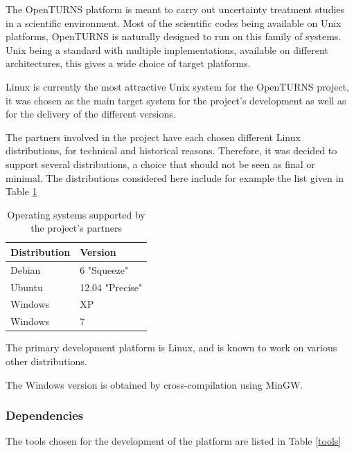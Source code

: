 The OpenTURNS platform is meant to carry out uncertainty treatment studies in a scientific environment. Most of the scientific codes being available on Unix platforms, OpenTURNS is naturally designed to run on this family of systems. Unix being a standard with multiple implementations, available on different architectures, this gives a wide choice of target platforms.

Linux is currently the most attractive Unix system for the OpenTURNS project, it was chosen as the main target system for the project's development as well as for the delivery of the different versions.

The partners involved in the project have each chosen different Linux distributions, for technical and historical reasons. Therefore, it was decided to support several distributions, a choice that should not be seen as final or minimal. The distributions considered here include for example the list given in Table \ref{linux}

\begin{center}
\begin{table}[h]
\caption{\label{linux}Operating systems supported by the project's partners}
\begin{center}
\begin{tabular}{|l|l|}
\hline
\textbf{Distribution} & \textbf{Version} \\
\hline \hline
Debian & 6 "Squeeze" \\
Ubuntu & 12.04 "Precise" \\
Windows & XP \\
Windows & 7 \\
\hline
\end{tabular}
\end{center}
\end{table}
\end{center}

The primary development platform is Linux, and is known to work on various other distributions.

The Windows version is obtained by cross-compilation using MinGW.

\subsubsection{Dependencies}

The tools chosen for the development of the platform are listed in Table \ref{tools}


